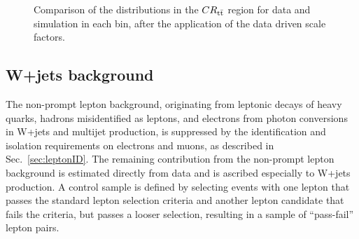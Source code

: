 \begin{figure}[htb]
\caption{Comparison of the \mll distributions in the $CR_{\mathrm{t}\bar{\mathrm{t}}}$ region for data and simulation in each \pth bin, after the application of the data driven scale factors.\label{fig:mllCtrlDD}}
\end{figure}




\subsection{W+jets background\label{sec:wjetsbkg}}	

The non-prompt lepton background, originating from leptonic decays of heavy quarks, hadrons
misidentified as leptons, and electrons from photon conversions in W+jets and multijet production, is suppressed by the identification and isolation requirements on electrons and muons,  as described in Sec.~\ref{sec:leptonID}. The remaining contribution from the non-prompt lepton background is estimated directly from data and is ascribed especially to W+jets production. A control sample is defined by selecting events with one lepton that passes the standard lepton selection criteria and another lepton candidate that fails the criteria, but passes a looser selection, resulting in a sample of ``pass-fail'' lepton pairs. 

